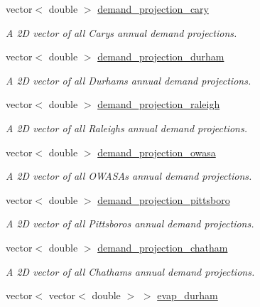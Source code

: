 \begin{DoxyCompactItemize}
vector$<$ double $>$ \mbox{\hyperlink{classTriangle_a120291dab66bd5cd55a20cc28602e964}{demand\+\_\+projection\+\_\+cary}}
\begin{DoxyCompactList}\small\item\em A 2D vector of all Cary\textquotesingle{}s annual demand projections. \end{DoxyCompactList}\item 
vector$<$ double $>$ \mbox{\hyperlink{classTriangle_a1e9cf765ec082728747bcb764afb65c1}{demand\+\_\+projection\+\_\+durham}}
\begin{DoxyCompactList}\small\item\em A 2D vector of all Durham\textquotesingle{}s annual demand projections. \end{DoxyCompactList}\item 
vector$<$ double $>$ \mbox{\hyperlink{classTriangle_a9baefa771a35e983bef69be315674018}{demand\+\_\+projection\+\_\+raleigh}}
\begin{DoxyCompactList}\small\item\em A 2D vector of all Raleigh\textquotesingle{}s annual demand projections. \end{DoxyCompactList}\item 
vector$<$ double $>$ \mbox{\hyperlink{classTriangle_abd773301ebaa53dc48221eab99a65415}{demand\+\_\+projection\+\_\+owasa}}
\begin{DoxyCompactList}\small\item\em A 2D vector of all O\+W\+A\+SA\textquotesingle{}s annual demand projections. \end{DoxyCompactList}\item 
vector$<$ double $>$ \mbox{\hyperlink{classTriangle_a97ac68c9d8d4f8aabfb1dc39236fe458}{demand\+\_\+projection\+\_\+pittsboro}}
\begin{DoxyCompactList}\small\item\em A 2D vector of all Pittsboro\textquotesingle{}s annual demand projections. \end{DoxyCompactList}\item 
vector$<$ double $>$ \mbox{\hyperlink{classTriangle_a16648fd432d646e1a2eaf25c64125b7a}{demand\+\_\+projection\+\_\+chatham}}
\begin{DoxyCompactList}\small\item\em A 2D vector of all Chatham\textquotesingle{}s annual demand projections. \end{DoxyCompactList}\item 
vector$<$ vector$<$ double $>$ $>$ \mbox{\hyperlink{classTriangle_a11dd71d21edee3cf466d30117e378fb9}{evap\+\_\+durham}}

\end{DoxyCompactItemize}
